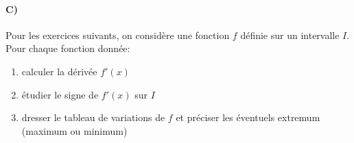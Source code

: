 \documentclass[a4paper]{article}
\begin{document}
  \paragraph{C)}
  Pour les exercices suivants, on considère une fonction $f$ définie sur un intervalle $I$. Pour chaque fonction donnée:
  \begin{enumerate}
    \item calculer la dérivée $f'(x)$
    \item étudier le signe de $f'(x)$ sur $I$
    \item dresser le tableau de variations de $f$ et préciser les éventuels extremum (maximum ou minimum)
  \end{enumerate}
\end{document}
